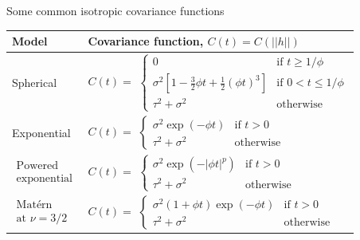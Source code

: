 %
%
%
%
%
\begin{frame}{Some common isotropic covariance functions}
	\vspace{-0.25in}
	\begin{table}[t]
		\begin{center}
			\begin{tabular}{|ll|}\hline
				Model & Covariance function, $C(t)=C(||h||)$ \\\hline %
				Spherical & $C(t) = $ $\left \{ \begin{array}{cl}
				0 & \mbox{if } t\geq1/\phi\\
				\sigma^{2}\left[  1-\frac{3}{2}\phi t+\frac{1}{2}(\phi
				t)^{3}\right] &
				\mbox{if } 0<t\leq1/\phi\\
				\tau^{2}+\sigma^{2} &  \mbox{otherwise}
				\end{array} \right .$\\
				Exponential & $C(t) = $
				$\left \{ \begin{array}{cl}%
				\sigma^{2}\exp(-\phi t) & \mbox{if } t>0\\
				\tau^{2}+\sigma^{2} & \mbox{otherwise}\end{array} \right .$\\
				$\begin{array}{l}
				\!\!\! \mbox{Powered} \\
				\! \mbox{exponential}
				\end{array}$
				& $C(t) = $
				$\left \{ \begin{array}{cl}%
				\sigma^{2}\exp(-|\phi t|^{p}) & \mbox{if } t>0\\
				\tau^{2}+\sigma^{2} & \mbox{otherwise}
				\end{array} \right .$
				\\
				$\begin{array}{l}
				\!\!\! \mbox{Mat\'{e}rn}\\
				\! \mbox{at } \nu=3/2
				\end{array}$
				& $C(t) = $ $\left \{ \begin{array}{cl} \sigma^{2}\left(1+\phi
				t\right)  \exp({-\phi t}) &
				\mbox{if } t>0\\
				\tau^2 + \sigma^{2} &  \mbox{otherwise}
				\end{array} \right .$
				\\\hline
			\end{tabular}
			

\end{center}
\end{table}
\end{frame}
